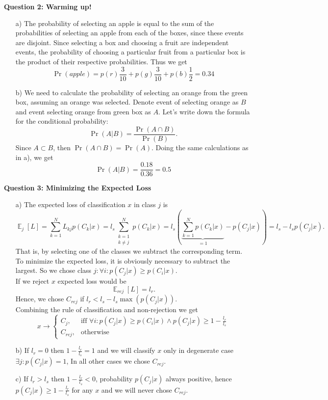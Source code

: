 \documentclass[12pt]{article}
\newcommand{\E}{\mathop{{}\mathbb{E}}}
\begin{document}
	\textbf{Question 2:  Warming up!}\\
	\begin{enumerate}
		\item[a)] 
		The probability of selecting an apple is equal to the sum of the probabilities of selecting an apple from each of the boxes, since these events are disjoint. Since selecting a box and choosing a fruit are independent events, the probability of choosing a particular fruit from a particular box is the product of their respective probabilities. Thus we get
		$$\Pr (apple) = p(r)\frac{3}{10} + p(g)\frac{3}{10} + p(b)\frac{1}{2} = 0.34$$
		
		\item[b)]
		We need to calculate the probability of selecting an orange from the green box, assuming an orange was selected. Denote event of selecting orange as $B$ and event selecting orange from green box as $A$. Let's write down the formula for the conditional probability:
		$$\Pr(A|B) = \frac{\Pr(A \cap B)}{\Pr(B)}.$$
		Since $A \subset B$, then $\Pr(A \cap B) = \Pr(A)$. Doing the same calculations as in a), we get
		$$ \Pr(A|B) = \frac{0.18}{0.36} = 0.5 $$
		
	\end{enumerate}


	\textbf{Question 3: Minimizing the Expected Loss}\\
	\begin{enumerate}
		\item[a)]
		The expected loss of classification $x$ in class $j$ is
		$$\E_j[L] = \sum_{k=1}^{N}L_{kj} p(C_k|x) = l_s\sum_{\substack{k=1\\ k \neq j}}^{N}p(C_k|x) =
		l_s\left( \underbrace{\sum_{k=1}^{N}p(C_k|x)}_{=1} - p(C_j|x)\right) = l_s - l_sp(C_j|x).$$
		That is, by selecting one of the classes we subtract the corresponding term. To minimize the expected loss, it is obviously necessary to subtract  the largest. So we chose class $j: \forall i:  p(C_j|x) \geq p(C_i|x)$. \\
		If we reject $x$ expected loss would be 
		$$ \E_{rej}[L] = l_r. $$
		Hence, we chose $C_{rej}$ if $l_r < l_s - l_s \max\left(p(C_j|x)\right)$.\\
		Combining the rule of classification and non-rejection we get
		$$ x \rightarrow \begin{cases} 
		C_j,& \text{iff } \forall i:  p(C_j|x) \geq p(C_i|x) \wedge p(C_j|x) \geq 1 - \frac{l_r}{l_s} \\
		C_{rej},& \text{otherwise}
		\end{cases} $$
		
		\item[b)] 
		If $l_r = 0$ then  $1-\frac{l_r}{l_s}=1$ and we will classify $x$ only in degenerate case  $\exists j: p(C_j|x) = 1$, In all other cases we chose $C_{rej}$. 
		
		\item[c)]
		If $l_r > l_s$ then $1-\frac{l_r}{l_s} < 0$, probability $p(C_j|x)$ always positive, hence $p(C_j|x) \geq 1-\frac{l_r}{l_s}$ for any $x$ and we will never chose $C_{rej}$.
	\end{enumerate}
	
\end{document}
